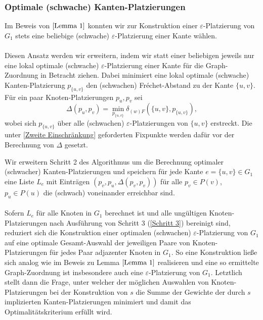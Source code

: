 \documentclass[a4paper, 12pt, twoside]{article}
\theoremstyle{Format1} %
\begin{document}
\subsubsection{Optimale (schwache) Kanten-Platzierungen}
Im Beweis von $\ref{Lemma 1}$ konnten wir zur Konstruktion einer $\varepsilon$-Platzierung von $G_1$ stets eine beliebige (schwache) $\varepsilon$-Platzierung einer Kante wählen.
\\
\\
Diesen Ansatz werden wir erweitern, indem wir statt einer beliebigen jeweils nur eine lokal optimale (schwache) $\varepsilon$-Platzierung einer Kante für
die Graph-Zuordnung in Betracht ziehen.
Dabei minimiert eine lokal optimale (schwache) Kanten-Platzierung $p_{\{u,v\}}$ den (schwachen) Fréchet-Abstand zu der Kante $\{u,v\}$.
Für ein paar Knoten-Platzierungen $p_u, p_v$ sei $$\Delta(p_u,p_v) = \min_{p_{{\{u,v}\}}} \delta_{(w)F}(\{u,v\},p_{\{u,v\}}),$$ wobei sich $p_{{\{u,v}\}}$ über alle
(schwachen) $\varepsilon$-Platzierungen von $\{u,v\}$ erstreckt. Die unter \ref{Zweite Einschränkung} geforderten Fixpunkte werden dafür vor der Berechnung von $\Delta$ gesetzt.

Wir erweitern Schritt 2 des Algorithmus um die Berechnung optimaler (schwacher) Kanten-Platzierungen und speichern für jede Kante $e=\{u,v\} \in G_1$ eine Liste $L_e$
mit Einträgen $(p_v, p_u, \Delta(p_v,p_v))$ für alle $p_v \in P(v)$, $p_u \in P(u)$ die (schwach) voneinander erreichbar sind.
\\
\\
Sofern $L_e$ für alle Knoten in $G_1$ berechnet ist und alle ungültigen Knoten-Platzierungen nach Ausführung von Schritt 3 (\ref{Schritt 3}) bereinigt sind,
reduziert sich die Konstruktion einer optimalen (schwachen) $\varepsilon$-Platzierung von $G_1$ auf eine optimale Gesamt-Auswahl der jeweiligen Paare von Knoten-Platzierungen für jedes Paar adjazenter Knoten in $G_1$.
So eine Konstruktion ließe sich analog wie im Beweis zu Lemma $\ref{Lemma 1}$ realisieren und eine so ermittelte Graph-Zuordnung ist insbesondere auch eine $\varepsilon$-Platzierung von $G_1$.
Letztlich stellt dann die Frage, unter welcher der möglichen Auswahlen von Knoten-Platzierungen bei der Konstruktion von $s$ die Summe der Gewichte der durch $s$ implizierten Kanten-Platzierungen
minimiert und damit das Optimalitätskriterium erfüllt wird.
\end{document}
